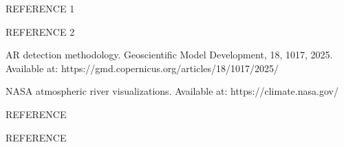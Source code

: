 \documentclass[journal abbreviation, manuscript]{copernicus}
\begin{document}
\begin{thebibliography}{}

REFERENCE 1

REFERENCE 2

AR detection methodology. Geoscientific Model Development, 18, 1017, 2025. Available at: https://gmd.copernicus.org/articles/18/1017/2025/ %

NASA atmospheric river visualizations. Available at: https://climate.nasa.gov/ %

REFERENCE %

REFERENCE %

\end{thebibliography}








\end{document}
